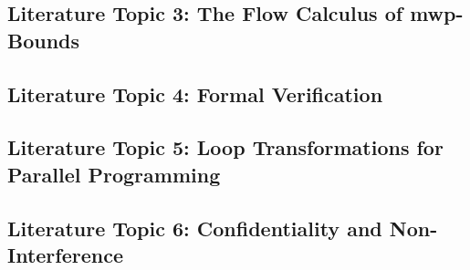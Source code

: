 \subsection{Literature Topic 3: The Flow Calculus of mwp-Bounds}\label{flow-calculus}
\subsection{Literature Topic 4: Formal Verification}\label{verification}
\subsection{Literature Topic 5: Loop Transformations for Parallel Programming}\label{transforms}
\subsection{Literature Topic 6: Confidentiality and Non-Interference}\label{pl-sec}